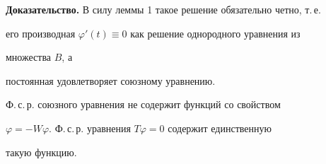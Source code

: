 


 


{\bf Доказательство.} В силу леммы 1 такое решение обязательно четно, т.\,е. 


его производная $\varphi'(t)\equiv0$ как решение однородного уравнения из 


множества $B$, а 


постоянная удовлетворяет союзному уравнению. 


 


 


\begin{lem} 


Ф.\,с.\,р. союзного уравнения не содержит функций со свойством 


$\varphi=-W\varphi$. Ф.\,с.\,р. уравнения $T\varphi=0$ содержит единственную 


такую функцию. 


\end{lem} 


 


 


